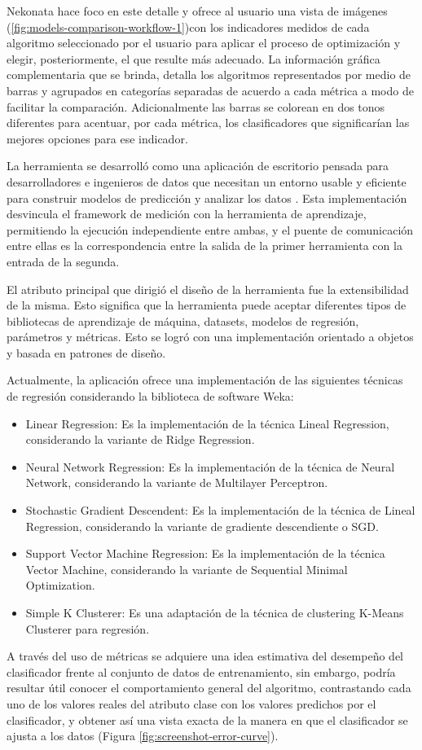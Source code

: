 Nekonata hace foco en este detalle y ofrece al usuario una vista de
imágenes (\ref{fig:models-comparison-workflow-1})con los indicadores
medidos de cada algoritmo seleccionado por el usuario para aplicar
el proceso de optimización y elegir, posteriormente, el que resulte
más adecuado. La información gráfica complementaria que se brinda,
detalla los algoritmos representados por medio de barras y agrupados
en categorías separadas de acuerdo a cada métrica a modo de facilitar
la comparación. Adicionalmente las barras se colorean en dos tonos
diferentes para acentuar, por cada métrica, los clasificadores que
significarían las mejores opciones para ese indicador. 

La herramienta se desarrolló como una aplicación de escritorio pensada
para desarrolladores e ingenieros de datos que necesitan un entorno
usable y eficiente para construir modelos de predicción y analizar
los datos . Esta implementación desvincula el framework de medición
con la herramienta de aprendizaje, permitiendo la ejecución independiente
entre ambas, y el puente de comunicación entre ellas es la correspondencia
entre la salida de la primer herramienta con la entrada de la segunda.

El atributo principal que dirigió el diseño de la herramienta fue
la extensibilidad de la misma. Esto significa que la herramienta puede
aceptar diferentes tipos de bibliotecas de aprendizaje de máquina,
datasets, modelos de regresión, parámetros y métricas. Esto se logró
con una implementación orientado a objetos y basada en patrones de
diseño.

Actualmente, la aplicación ofrece una implementación de las siguientes
técnicas de regresión considerando la biblioteca de software Weka:
\begin{itemize}
\item Linear Regression: Es la implementación de la técnica Lineal Regression,
considerando la variante de Ridge Regression.
\item Neural Network Regression: Es la implementación de la técnica de Neural
Network, considerando la variante de Multilayer Perceptron.
\item Stochastic Gradient Descendent: Es la implementación de la técnica
de Lineal Regression, considerando la variante de gradiente descendiente
o SGD.
\item Support Vector Machine Regression: Es la implementación de la técnica
Vector Machine, considerando la variante de Sequential Minimal Optimization.
\item Simple K Clusterer: Es una adaptación de la técnica de clustering
K-Means Clusterer para regresión.
\end{itemize}
A través del uso de métricas se adquiere una idea estimativa del desempeño
del clasificador frente al conjunto de datos de entrenamiento, sin
embargo, podría resultar útil conocer el comportamiento general del
algoritmo, contrastando cada uno de los valores reales del atributo
clase con los valores predichos por el clasificador, y obtener así
una vista exacta de la manera en que el clasificador se ajusta a los
datos (Figura \ref{fig:screenshot-error-curve}). 

